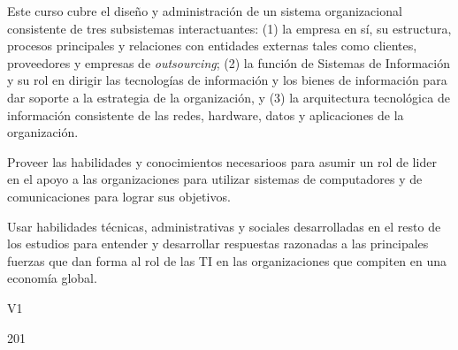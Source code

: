 \begin{syllabus}


\begin{justification}
Este curso cubre el diseño y administración de un sistema organizacional consistente de tres subsistemas interactuantes: (1) la empresa en sí­, su estructura, procesos principales y relaciones con entidades externas tales como clientes, proveedores y empresas de \emph{outsourcing}; (2) la función de Sistemas de Información y su rol en dirigir las tecnologías de información y los bienes de información para dar soporte a la estrategia de la organización, y (3) la arquitectura tecnológica de información consistente de las redes, hardware, datos y aplicaciones de la organización. 
\end{justification}

\begin{goals}
\item Proveer las habilidades y conocimientos necesarioos para asumir un rol de lider en el apoyo a las organizaciones para utilizar sistemas de computadores y de comunicaciones para lograr sus objetivos. 
\item Usar habilidades técnicas, administrativas y sociales desarrolladas en el resto de los estudios para entender y desarrollar respuestas razonadas a las principales fuerzas que dan forma al rol de las TI en las organizaciones que compiten en una economía global.
\end{goals}

\begin{outcomes}{V1}
\end{outcomes}

\begin{unit}{\LUTWOONETWODef}{}{\LUTWOONETWOBib}{20}{1}
   \begin{topics}
   	\item \OMCONETopicTWOxONExONEOH
   	\item \OMCONEONETopicTWOxONEONExONE
   	\item \OMCONEONETopicTWOxONEONExONEFIVE
	\item \OMCONETopicTWOxONExNINE
	\begin{subtopics}
		\item \OMCONETopicTWOxONExNINExSEVEN
		\item \OMCONETopicTWOxONExNINExEIGHT
		\item \OMCONETopicTWOxONExNINExNINE
	\end{subtopics} 	
   	\item \OMCTHREETopicTWOxTHREExTHREE
   	\item \OMCTWOTopicTWOxTWOxONEOH
   \end{topics}
	\LUTWOONETWOGoal
\end{unit}


\end{syllabus}
